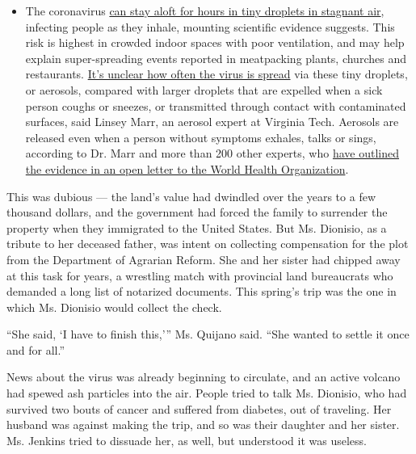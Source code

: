 \begin{itemize}
  \begin{itemize}
  \tightlist
  \item
    The coronavirus
    \href{https://www.nytimes.com/2020/07/04/health/239-experts-with-one-big-claim-the-coronavirus-is-airborne.html?action=click\&pgtype=Article\&state=default\&region=MAIN_CONTENT_3\&context=storylines_faq}{can
    stay aloft for hours in tiny droplets in stagnant air}, infecting
    people as they inhale, mounting scientific evidence suggests. This
    risk is highest in crowded indoor spaces with poor ventilation, and
    may help explain super-spreading events reported in meatpacking
    plants, churches and restaurants.
    \href{https://www.nytimes.com/2020/07/06/health/coronavirus-airborne-aerosols.html?action=click\&pgtype=Article\&state=default\&region=MAIN_CONTENT_3\&context=storylines_faq}{It's
    unclear how often the virus is spread} via these tiny droplets, or
    aerosols, compared with larger droplets that are expelled when a
    sick person coughs or sneezes, or transmitted through contact with
    contaminated surfaces, said Linsey Marr, an aerosol expert at
    Virginia Tech. Aerosols are released even when a person without
    symptoms exhales, talks or sings, according to Dr. Marr and more
    than 200 other experts, who
    \href{https://academic.oup.com/cid/article/doi/10.1093/cid/ciaa939/5867798}{have
    outlined the evidence in an open letter to the World Health
    Organization}.
  \end{itemize}
\end{itemize}

This was dubious --- the land's value had dwindled over the years to a
few thousand dollars, and the government had forced the family to
surrender the property when they immigrated to the United States. But
Ms. Dionisio, as a tribute to her deceased father, was intent on
collecting compensation for the plot from the Department of Agrarian
Reform. She and her sister had chipped away at this task for years, a
wrestling match with provincial land bureaucrats who demanded a long
list of notarized documents. This spring's trip was the one in which Ms.
Dionisio would collect the check.

``She said, `I have to finish this,''' Ms. Quijano said. ``She wanted to
settle it once and for all.''

News about the virus was already beginning to circulate, and an active
volcano had spewed ash particles into the air. People tried to talk Ms.
Dionisio, who had survived two bouts of cancer and suffered from
diabetes, out of traveling. Her husband was against making the trip, and
so was their daughter and her sister. Ms. Jenkins tried to dissuade her,
as well, but understood it was useless.

